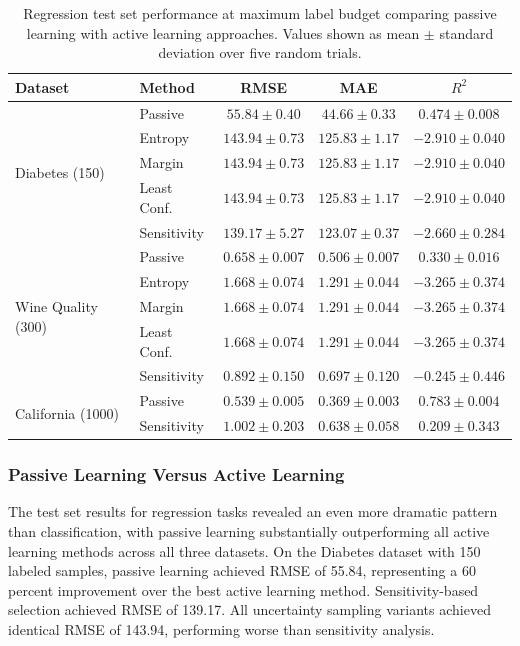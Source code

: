 \documentclass[conference]{IEEEtran}
\begin{document}
\begin{table}[t]
\centering
\caption{Regression test set performance at maximum label budget comparing passive learning with active learning approaches. Values shown as mean $\pm$ standard deviation over five random trials.}
\label{tab:reg-results}
\begin{tabular}{llccc}
\toprule
Dataset & Method & RMSE & MAE & $R^2$ \\
\midrule
\multirow{5}{*}{Diabetes (150)} & Passive & $\mathbf{55.84 \pm 0.40}$ & $\mathbf{44.66 \pm 0.33}$ & $\mathbf{0.474 \pm 0.008}$ \\
 & Entropy & $143.94 \pm 0.73$ & $125.83 \pm 1.17$ & $-2.910 \pm 0.040$ \\
 & Margin & $143.94 \pm 0.73$ & $125.83 \pm 1.17$ & $-2.910 \pm 0.040$ \\
 & Least Conf. & $143.94 \pm 0.73$ & $125.83 \pm 1.17$ & $-2.910 \pm 0.040$ \\
 & Sensitivity & $139.17 \pm 5.27$ & $123.07 \pm 0.37$ & $-2.660 \pm 0.284$ \\
\midrule
\multirow{5}{*}{Wine Quality (300)} & Passive & $\mathbf{0.658 \pm 0.007}$ & $\mathbf{0.506 \pm 0.007}$ & $\mathbf{0.330 \pm 0.016}$ \\
 & Entropy & $1.668 \pm 0.074$ & $1.291 \pm 0.044$ & $-3.265 \pm 0.374$ \\
 & Margin & $1.668 \pm 0.074$ & $1.291 \pm 0.044$ & $-3.265 \pm 0.374$ \\
 & Least Conf. & $1.668 \pm 0.074$ & $1.291 \pm 0.044$ & $-3.265 \pm 0.374$ \\
 & Sensitivity & $0.892 \pm 0.150$ & $0.697 \pm 0.120$ & $-0.245 \pm 0.446$ \\
\midrule
\multirow{2}{*}{California (1000)} & Passive & $\mathbf{0.539 \pm 0.005}$ & $\mathbf{0.369 \pm 0.003}$ & $\mathbf{0.783 \pm 0.004}$ \\
 & Sensitivity & $1.002 \pm 0.203$ & $0.638 \pm 0.058$ & $0.209 \pm 0.343$ \\
\bottomrule
\end{tabular}
\end{table}

\subsubsection{Passive Learning Versus Active Learning}

The test set results for regression tasks revealed an even more dramatic pattern than classification, with passive learning substantially outperforming all active learning methods across all three datasets. On the Diabetes dataset with 150 labeled samples, passive learning achieved RMSE of 55.84, representing a 60 percent improvement over the best active learning method. Sensitivity-based selection achieved RMSE of 139.17. All uncertainty sampling variants achieved identical RMSE of 143.94, performing worse than sensitivity analysis.
\end{document}
